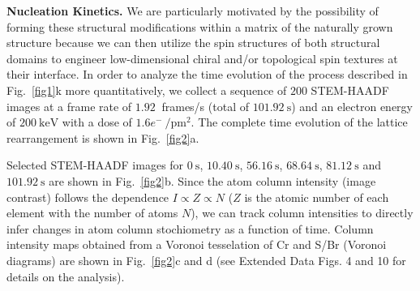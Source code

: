 \documentclass[aps,prl,showpacs,twocolumn,superscriptaddress,floatfix]{revtex4-2}
\newcommand{\figurescale}{1}
\renewcommand\figurename{Figure}
\begin{document}
\begin{figure*}
	\scalebox{\figurescale}{\texttt{[image: Figure3.pdf]}}
	\renewcommand{\figurename}{\textbf{Fig.|}}
	\caption{\label{fig3}
		\textbf{Electronic and magnetic properties of rearranged CrSBr.} 
		\textbf{a}, Brillouin zone of bulk \textbf{a} pristine and \textbf{b} rearranged CrSBr and their corresponding spin resolved DFT-PBE electronic band structure \textbf{c} and \textbf{d}.
		\textbf{e}, FM intralayer superexchange and AFM interlayer super-superexchange between the Cr atoms mediated by one or two ligands.
		\textbf{f}, Level scheme of intralayer superexchange interaction between Cr atoms. Crystal field splitting into doubly degenerate $e_g$ and triple degenerate $t_{2g}$ orbitals and the corresponding hopping terms for FM and AFM coupling.
		\textbf{g}, Pristine CrSBr exhibits intralayer FM order and interlayer AFM order for $T < T_N$. The rearranged CrSBr shows intralayer FM order and weak AFM order. Scale bar is \SI{1}{\nano\meter}.
		}
\end{figure*}

\textbf{Nucleation Kinetics.} We are particularly motivated by the possibility of forming these structural modifications within a matrix of the naturally grown structure because we can then utilize the spin structures of both structural domains to engineer low-dimensional chiral and/or topological spin textures at their interface. In order to analyze the time evolution of the process described in Fig.~\ref{fig1}k more quantitatively, we collect a sequence of $200$ STEM-HAADF images at a frame rate of $\SI{1.92}{}$ frames/s (total of $\SI{101.92}{\second}$) and an electron energy of $\SI{200}{\kilo\electronvolt}$ with a dose of $1.6 e^{-}\SI{}{\per\pico\meter\squared}$. The complete time evolution of the lattice rearrangement is shown in Fig.~\ref{fig2}a.

Selected STEM-HAADF images for $\SI{0}{\second}$, $\SI{10.40}{\second}$, $\SI{56.16}{\second}$, $\SI{68.64}{\second}$, $\SI{81.12}{\second}$ and $\SI{101.92}{\second}$ are shown in Fig.~\ref{fig2}b. Since the atom column intensity (image contrast) follows the dependence $I \propto Z \propto N$ ($Z$ is the atomic number of each element with the number of atoms $N$), we can track column intensities to directly infer changes in atom column stochiometry as a function of time. Column intensity maps obtained from a Voronoi tesselation of Cr and S/Br (Voronoi diagrams) are shown in Fig.~\ref{fig2}c and d (see Extended Data Figs. 4 and 10 for details on the analysis).
\end{document}
